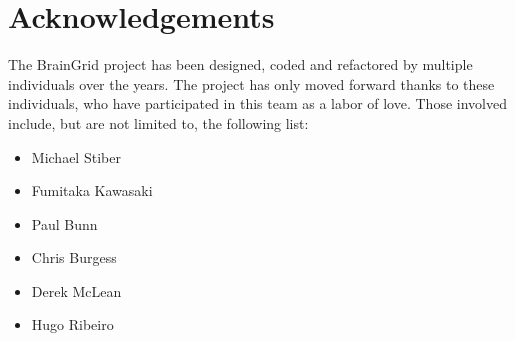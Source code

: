 \section{Acknowledgements}
\mdseries The BrainGrid project has been designed, coded and refactored by multiple individuals over the years. The project has only moved forward thanks to these individuals, who have participated in this team as a labor of love. Those involved include, but are not limited to, the following list:
\begin{itemize}
	\item	Michael Stiber
	\item Fumitaka Kawasaki
	\item Paul Bunn
	\item Chris Burgess
	\item Derek McLean
	\item Hugo Ribeiro
\end{itemize}
